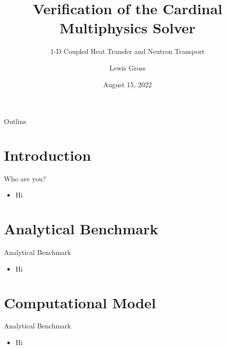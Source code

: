 \documentclass[8pt,t]{beamer}
\title{Verification of the Cardinal Multiphysics Solver}
\subtitle{1-D Coupled Heat Transfer and Neutron Transport}
\author{Lewis Gross}
\date{August 15, 2022}
\begin{document}
\maketitle

\begin{frame}{Outline}
  \tableofcontents
\end{frame}


\section{Introduction}
\begin{frame}{Who are you?}
    \begin{itemize}
        \item Hi
    \end{itemize}
\end{frame}


\section{Analytical Benchmark}
\begin{frame}{Analytical Benchmark}
    \begin{itemize}
        \item Hi
    \end{itemize}
\end{frame}


\section{Computational Model}
\begin{frame}{Analytical Benchmark}
    \begin{itemize}
        \item Hi
    \end{itemize}
\end{frame}
\end{document}
